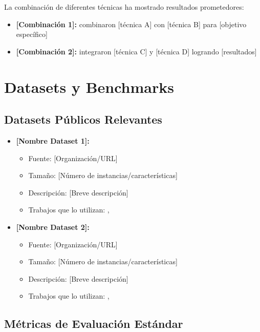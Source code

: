 La combinación de diferentes técnicas ha mostrado resultados prometedores:

\begin{itemize}
    \item \textbf{[Combinación 1]:} \citet{autor2023_hibrido1} combinaron [técnica A] con [técnica B] para [objetivo específico]
    \item \textbf{[Combinación 2]:} \citet{autor2023_hibrido2} integraron [técnica C] y [técnica D] logrando [resultados]
\end{itemize}

\section{Datasets y Benchmarks}

\subsection{Datasets Públicos Relevantes}

\begin{itemize}
    \item \textbf{[Nombre Dataset 1]:} 
        \begin{itemize}
            \item Fuente: [Organización/URL]
            \item Tamaño: [Número de instancias/características]
            \item Descripción: [Breve descripción]
            \item Trabajos que lo utilizan: \citet{autor1}, \citet{autor2}
        \end{itemize}
    
    \item \textbf{[Nombre Dataset 2]:}
        \begin{itemize}
            \item Fuente: [Organización/URL]
            \item Tamaño: [Número de instancias/características]
            \item Descripción: [Breve descripción]
            \item Trabajos que lo utilizan: \citet{autor3}, \citet{autor4}
        \end{itemize}
\end{itemize}

\subsection{Métricas de Evaluación Estándar}

